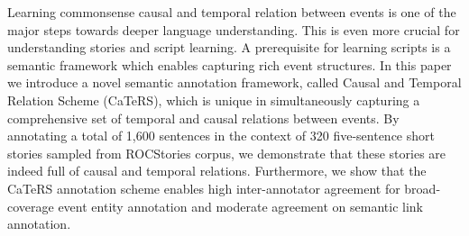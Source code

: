 Learning commonsense causal and temporal relation between events is one of the major steps towards deeper language understanding. This is even more crucial for understanding stories and script learning. A prerequisite for learning scripts is a semantic framework which enables capturing rich event structures. In this paper we introduce a novel semantic annotation framework, called Causal and Temporal Relation Scheme (CaTeRS), which is unique in simultaneously capturing a comprehensive set of temporal and causal relations between events. By annotating a total of 1,600 sentences in the context of 320 five-sentence short stories sampled from ROCStories corpus, we demonstrate that these stories are indeed full of causal and temporal relations. Furthermore, we show that the CaTeRS annotation scheme enables high inter-annotator agreement for broad-coverage event entity annotation and moderate agreement on semantic link annotation.
